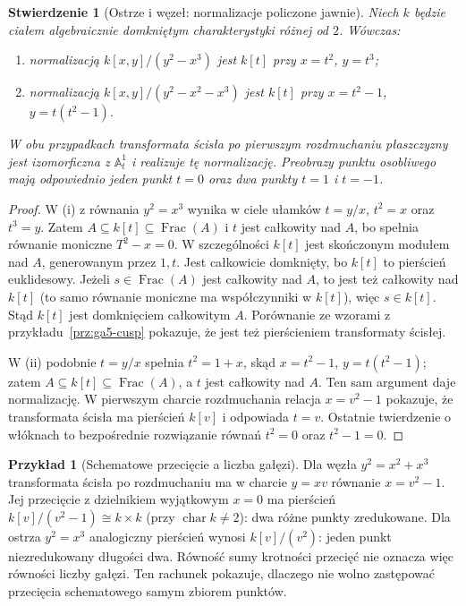\documentclass[11pt,a4paper,openany]{report}
\numberwithin{equation}{section}
\theoremstyle{plain}
\newtheorem{stwierdzenie}[twierdzenie]{Stwierdzenie}
\theoremstyle{definition}
\newtheorem{przyklad}[twierdzenie]{Przykład}
\theoremstyle{remark}
\newcommand{\A}{\mathbb A}
\newcommand{\Frac}{\operatorname{Frac}}
\begin{document}
\begin{stwierdzenie}[Ostrze i węzeł: normalizacje policzone jawnie]
\label{st:ga5-normalization}
Niech $k$ będzie ciałem algebraicznie domkniętym
charakterystyki różnej od $2$. Wówczas:
\begin{enumerate}[label=(\roman*)]
\item normalizacją $k[x,y]/(y^2-x^3)$ jest $k[t]$
przy $x=t^2$, $y=t^3$;
\item normalizacją $k[x,y]/(y^2-x^2-x^3)$ jest
$k[t]$ przy $x=t^2-1$, $y=t(t^2-1)$.
\end{enumerate}
W obu przypadkach transformata ścisła po pierwszym
rozdmuchaniu płaszczyzny jest izomorficzna z $\A^1_t$
i realizuje tę normalizację. Preobrazy punktu osobliwego
mają odpowiednio jeden punkt $t=0$ oraz dwa punkty
$t=1$ i $t=-1$.
\end{stwierdzenie}
\begin{proof}
W (i) z równania $y^2=x^3$ wynika w ciele ułamków
$t=y/x$, $t^2=x$ oraz $t^3=y$. Zatem
$A\subseteq k[t]\subseteq\Frac(A)$ i $t$ jest całkowity
nad $A$, bo spełnia równanie moniczne $T^2-x=0$.
W szczególności $k[t]$ jest skończonym modułem nad
$A$, generowanym przez $1,t$. Jest całkowicie
domknięty, bo $k[t]$ to pierścień euklidesowy.
Jeżeli $s\in\Frac(A)$ jest całkowity nad $A$, to jest
też całkowity nad $k[t]$ (to samo równanie moniczne
ma współczynniki w $k[t]$), więc $s\in k[t]$.
Stąd $k[t]$ jest domknięciem całkowitym $A$.
Porównanie ze wzorami z przykładu~\ref{prz:ga5-cusp}
pokazuje, że jest też pierścieniem transformaty ścisłej.

W (ii) podobnie $t=y/x$ spełnia $t^2=1+x$,
skąd $x=t^2-1$, $y=t(t^2-1)$; zatem
$A\subseteq k[t]\subseteq\Frac(A)$, a $t$ jest
całkowity nad $A$. Ten sam argument daje normalizację.
W pierwszym charcie rozdmuchania relacja
$x=v^2-1$ pokazuje, że transformata ścisła ma
pierścień $k[v]$ i odpowiada $t=v$.
Ostatnie twierdzenie o włóknach to bezpośrednie
rozwiązanie równań $t^2=0$ oraz $t^2-1=0$.
\end{proof}

\begin{przyklad}[Schematowe przecięcie a liczba gałęzi]
Dla węzła $y^2=x^2+x^3$ transformata ścisła po
rozdmuchaniu ma w charcie $y=xv$ równanie
$x=v^2-1$. Jej przecięcie z dzielnikiem wyjątkowym
$x=0$ ma pierścień $k[v]/(v^2-1)\cong k\times k$
(przy $\operatorname{char}k\ne2$): dwa różne punkty
zredukowane. Dla ostrza $y^2=x^3$ analogiczny
pierścień wynosi $k[v]/(v^2)$: jeden punkt
niezredukowany długości dwa. Równość sumy krotności
przecięć nie oznacza więc równości liczby gałęzi.
Ten rachunek pokazuje, dlaczego nie wolno zastępować
przecięcia schematowego samym zbiorem punktów.
\end{przyklad}
\end{document}
